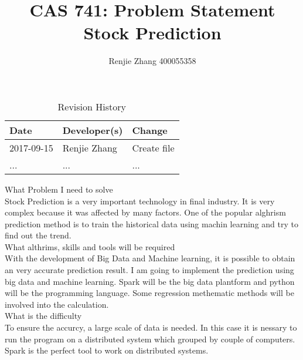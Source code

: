 \documentclass[12pt]{article}
\title{CAS 741: Problem Statement\\Stock Prediction\\}
\author{Renjie Zhang  400055358}
\begin{document}
\maketitle

\begin{table}[hp]
\caption{Revision History} \label{TblRevisionHistory}
\begin{tabularx}{\textwidth}{llX}
\toprule
\textbf{Date} & \textbf{Developer(s)} & \textbf{Change}\\
\midrule
2017-09-15 & Renjie Zhang & Create file\\

... & ... & ...\\
\bottomrule
\end{tabularx}
\end{table}

What Problem I need to solve\\
Stock Prediction is a very important technology in final industry. It is very complex because it was affected by many factors.  One of the popular alghrism prediction method is to train the historical data using machin learning and try to find out the trend. \\

What althrims, skills and tools will be required\\
With the development of Big Data and Machine learning, it is possible to obtain an very accurate prediction result. I am going to implement the prediction using big data and machine learning. Spark will be the big data plantform and python will be the programming language. Some regression methematic methods will be involved  into the calculation.\\


What is the difficulty\\
To ensure the accurcy, a large scale of data is needed. In this case it is nessary to run the program on a distributed system which grouped by couple of computers. Spark is the perfect tool to work on distributed systems.\\
\end{document}
